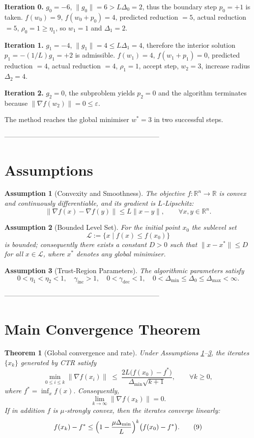 \documentclass{article}
\newtheorem{theorem}{Theorem}[section]
\newtheorem{assumption}{Assumption}[section]
\begin{document}
\textbf{Iteration 0.}  
$g_{0}=-6$, $\|g_{0}\|=6> L\Delta_{0}=2$, thus the boundary step $p_{0}=+1$ is taken.  
$f(w_{0})=9$, $f(w_{0}+p_{0})=4$, predicted reduction $=5$, actual reduction $=5$, $\rho_{0}=1\ge\eta_{1}$, so $w_{1}=1$ and $\Delta_{1}=2$.

\textbf{Iteration 1.}  
$g_{1}=-4$, $\|g_{1}\|=4\le L\Delta_{1}=4$, therefore the interior solution $p_{1}=-(1/L)g_{1}=+2$ is admissible.  
$f(w_{1})=4$, $f(w_{1}+p_{1})=0$, predicted reduction $=4$, actual reduction $=4$, $\rho_{1}=1$, accept step, $w_{2}=3$, increase radius $\Delta_{2}=4$.

\textbf{Iteration 2.}  
$g_{2}=0$, the subproblem yields $p_{2}=0$ and the algorithm terminates because $\|\nabla f(w_{2})\|=0\le\varepsilon$.

The method reaches the global minimiser $w^{*}=3$ in two successful steps.

--------------------------------------------------------------------

\section*{Assumptions}
\begin{assumption}[Convexity and Smoothness]\label{ass:convex}
The objective $f:\mathbb{R}^{n}\to\mathbb{R}$ is convex and continuously differentiable,
and its gradient is $L$‑Lipschitz:
\[
\|\nabla f(x)-\nabla f(y)\|\le L\|x-y\|,\qquad\forall x,y\in\mathbb{R}^{n}.
\]
\end{assumption}
\begin{assumption}[Bounded Level Set]\label{ass:bounded}
For the initial point $x_{0}$ the sublevel set
\[
\mathcal{L}:=\{x\;|\; f(x)\le f(x_{0})\}
\]
is bounded; consequently there exists a constant $D>0$ such that
$\|x-x^{*}\|\le D$ for all $x\in\mathcal{L}$, where $x^{*}$ denotes any global minimiser.
\end{assumption}
\begin{assumption}[Trust‑Region Parameters]\label{ass:params}
The algorithmic parameters satisfy
\[
0<\eta_{1}<\eta_{2}<1,\quad
\gamma_{\text{inc}}>1,\quad
0<\gamma_{\text{dec}}<1,\quad
0<\Delta_{\min}\le\Delta_{0}\le\Delta_{\max}<\infty .
\]
\end{assumption}

--------------------------------------------------------------------

\section*{Main Convergence Theorem}
\begin{theorem}[Global convergence and rate]\label{thm:conv}
Under Assumptions \ref{ass:convex}–\ref{ass:params}, the iterates $\{x_{k}\}$ generated by
CTR satisfy
\[
\min_{0\le i\le k}\|\nabla f(x_{i})\|
\;\le\;
\frac{2L\bigl(f(x_{0})-f^{*}\bigr)}{\Delta_{\min}\sqrt{k+1}},
\qquad\forall k\ge0,
\tag{8}
\]
where $f^{*}=\inf_{x}f(x)$. Consequently,
\[
\lim_{k\to\infty}\|\nabla f(x_{k})\|=0.
\]
If in addition $f$ is $\mu$‑strongly convex, then the iterates converge linearly:
\[
f(x_{k})-f^{*}\le\Bigl(1-\frac{\mu\Delta_{\min}}{L}\Bigr)^{k}
\bigl(f(x_{0})-f^{*}\bigr).
\tag{9}
\]
\end{theorem}
\end{document}
